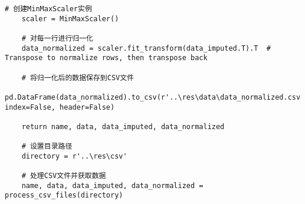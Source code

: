 \begin{lstlisting}[caption={数据预处理代码}]
	# 创建MinMaxScaler实例
	scaler = MinMaxScaler()
	
	# 对每一行进行归一化
	data_normalized = scaler.fit_transform(data_imputed.T).T  # Transpose to normalize rows, then transpose back
	
	# 将归一化后的数据保存到CSV文件
	pd.DataFrame(data_normalized).to_csv(r'..\res\data\data_normalized.csv', index=False, header=False)
	
	return name, data, data_imputed, data_normalized
	
	# 设置目录路径
	directory = r'..\res\csv'
	
	# 处理CSV文件并获取数据
	name, data, data_imputed, data_normalized = process_csv_files(directory)

\end{lstlisting}


